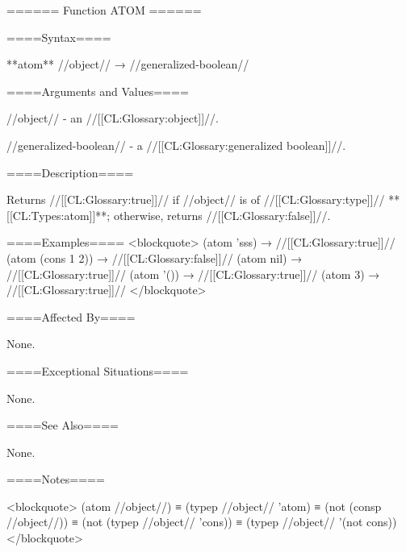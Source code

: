 ====== Function ATOM ======

====Syntax====

**atom** //object// → //generalized-boolean//

====Arguments and Values====

//object// - an //[[CL:Glossary:object]]//.

//generalized-boolean// - a //[[CL:Glossary:generalized boolean]]//.

====Description====

Returns //[[CL:Glossary:true]]// if //object// is of //[[CL:Glossary:type]]// **[[CL:Types:atom]]**; otherwise, returns //[[CL:Glossary:false]]//.

====Examples==== <blockquote> (atom 'sss) → //[[CL:Glossary:true]]// (atom (cons 1 2)) → //[[CL:Glossary:false]]// (atom nil) → //[[CL:Glossary:true]]// (atom '()) → //[[CL:Glossary:true]]// (atom 3) → //[[CL:Glossary:true]]// </blockquote>

====Affected By====

None.

====Exceptional Situations====

None.

====See Also====

None.

====Notes====

<blockquote> (atom //object//) ≡ (typep //object// 'atom) ≡ (not (consp //object//)) ≡ (not (typep //object// 'cons)) ≡ (typep //object// '(not cons)) </blockquote>

